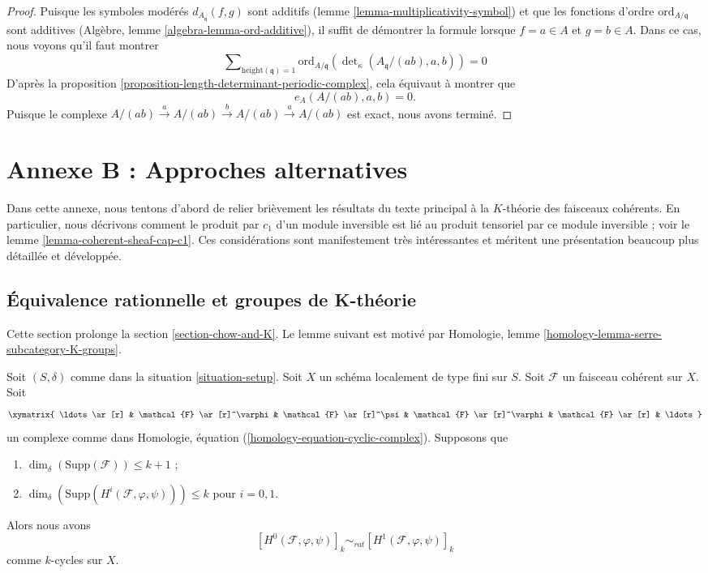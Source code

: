 \begin{proof}
Puisque les symboles modérés $d_{A_{\mathfrak q}}(f, g)$ sont additifs
(lemme \ref{lemma-multiplicativity-symbol}) et que les fonctions d'ordre
$\text{ord}_{A/\mathfrak q}$
sont additives (Algèbre, lemme \ref{algebra-lemma-ord-additive}),
il suffit de démontrer la formule lorsque $f = a \in A$ et
$g = b \in A$. Dans ce cas, nous voyons qu'il faut montrer
$$
\sum\nolimits_{\text{height}(\mathfrak q) = 1}
\text{ord}_{A/\mathfrak q}(\det\nolimits_\kappa(A_{\mathfrak q}/(ab), a, b))
= 0
$$
D'après la proposition \ref{proposition-length-determinant-periodic-complex},
cela équivaut à montrer que
$$
e_A(A/(ab), a, b) = 0.
$$
Puisque le complexe
$A/(ab) \xrightarrow{a} A/(ab) \xrightarrow{b} A/(ab) \xrightarrow{a} A/(ab)$
est exact, nous avons terminé.
\end{proof}





\section{Annexe B : Approches alternatives}
\label{section-appendix-chow}

\noindent
Dans cette annexe, nous tentons d'abord de relier brièvement les résultats
du texte principal à la $K$-théorie des faisceaux cohérents. En
particulier, nous décrivons comment le produit par $c_1$ d'un
module inversible est lié au produit tensoriel par ce module inversible ; voir le
lemme \ref{lemma-coherent-sheaf-cap-c1}.
Ces considérations sont manifestement très intéressantes et
méritent une présentation beaucoup plus détaillée et développée.


\subsection{Équivalence rationnelle et groupes de K-théorie}
\label{subsection-rational-equivalence-K-groups}

\noindent
Cette section prolonge la section \ref{section-chow-and-K}.
Le lemme suivant est motivé par
Homologie, lemme \ref{homology-lemma-serre-subcategory-K-groups}.

\begin{lemma}
\label{lemma-maps-between-coherent-sheaves}
Soit $(S, \delta)$ comme dans la situation \ref{situation-setup}.
Soit $X$ un schéma localement de type fini sur $S$.
Soit $\mathcal{F}$ un faisceau cohérent sur $X$.
Soit
$$
\xymatrix{
\ldots \ar[r] &
\mathcal{F} \ar[r]^\varphi &
\mathcal{F} \ar[r]^\psi &
\mathcal{F} \ar[r]^\varphi &
\mathcal{F} \ar[r] & \ldots
}
$$
un complexe comme dans Homologie, équation (\ref{homology-equation-cyclic-complex}).
Supposons que
\begin{enumerate}
\item $\dim_\delta(\text{Supp}(\mathcal{F})) \leq k + 1$ ;
\item $\dim_\delta(\text{Supp}(H^i(\mathcal{F}, \varphi, \psi))) \leq k$
pour $i = 0, 1$.
\end{enumerate}
Alors nous avons
$$
[H^0(\mathcal{F}, \varphi, \psi)]_k
\sim_{rat}
[H^1(\mathcal{F}, \varphi, \psi)]_k
$$
comme $k$-cycles sur $X$.
\end{lemma}


